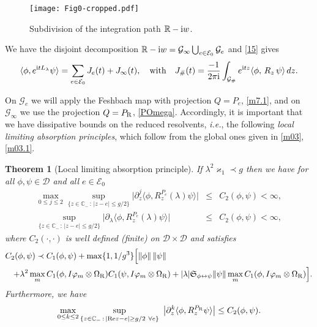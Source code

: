 \documentclass[letterpaper,onecolumn,11pt,accepted=2021-12-09]{quantumarticle}
\numberwithin{equation}{section}
\newcounter{resultcounter}[section]
\newtheorem{thm}[resultcounter]{Theorem}
\newcommand{\sym}{ {\mathfrak S}_{\phi\leftrightarrow\psi}}
\renewcommand{\r}{{\rm R}}
\renewcommand{\i}{{\rm i}}
\begin{document}
\begin{figure}[t]
	\centering
\texttt{[image: Fig0-cropped.pdf]}	
	\caption{Subdivision of the integration path ${\mathbb R}-\i w$.}
	\label{Fig2}
\end{figure}

We have the disjoint decomposition  ${\mathbb R}-\i w = {\mathcal G}_\infty \bigcup_{e\in {\mathcal E}_0} {\mathcal G}_e$ and \eqref{15} gives 
\begin{equation}
	\langle \phi, e^{\i t L_\lambda}\psi\rangle = \sum_{e\in{\mathcal E}_0} J_e(t) +J_\infty(t), \quad \mbox{with}\quad 
J_\# (t) =\frac{-1}{2\pi\i} \int_{{\mathcal G}_\#} e^{\i tz}\langle \phi,   \, R_z\,    \psi \rangle \, dz.
	\label{19}
\end{equation}

On ${\mathcal G}_e$ we will apply the Feshbach map with projection $Q=P_e$, \eqref{m7.1}, and on ${\mathcal G}_\infty$ we use the projection $Q=P_\r$, \eqref{POmega}. Accordingly, it is important that we have dissipative bounds on the reduced resolvents, {\em i.e.}, the following {\em local limiting absorption principles}, which follow from the global ones given in \eqref{m03}, \eqref{m03.1}.

\begin{thm}[Local limiting absorption principle]
	\label{thmA1}
	If $\lambda^2\varkappa_1\prec g$ then we have for all $\phi,\psi\in{\mathcal D}$ and all $e\in{\mathcal E}_0$
	\begin{eqnarray}
	\max_{0\le j\le 2}\sup_{ \{z\in{\mathbb C}_- \, :\,  |z-e|\le g/2 \}}\Big| \partial_z^j \langle\phi, R_z^{P_e}(\lambda) \psi\rangle\Big| &\le& C_2(\phi,\psi)<\infty,
	\label{32}\\
	\sup_{ \{z\in{\mathbb C}_- \, :\,  |z-e|\le g/2 \}}\Big| \partial_\lambda\langle\phi, R_z^{P_e}(\lambda) \psi\rangle\Big| &\le& C_2(\phi,\psi)<\infty,
	\label{034}
	\end{eqnarray}
	where $C_2(\cdot,\cdot)$ is well defined (finite) on ${\mathcal D}\times{\mathcal D}$ and satisfies
	\begin{eqnarray}
	\lefteqn{
		C_2(\phi,\psi) \prec    C_1(\phi,\psi) +\max\{1,1/g^3\} \Big[ \|\phi\|\, \|\psi\|} \label{198.1}\\
	&& +\lambda^2  \max_m C_1(\phi, I\varphi_m\otimes\Omega_\r) C_1(\psi, I\varphi_m\otimes\Omega_\r) +|\lambda| \sym \|\psi\| \max_m C_1(\phi, I \varphi_m\otimes \Omega_\r)\Big].\nonumber
	\end{eqnarray}
	Furthermore, we have
	\begin{equation}
	\max_{0\le k\le 2}			\sup_{ 	\{z\in{\mathbb C}_-\, : \, |{\rm Re}z-e|\ge g/2\  \forall e \}} \ \big|\partial_z^k \langle\phi, R_z^{P_\r}\psi\rangle\big| \le C_2(\phi,\psi).
	\label{33}
	\end{equation}
\end{thm}
\end{document}
